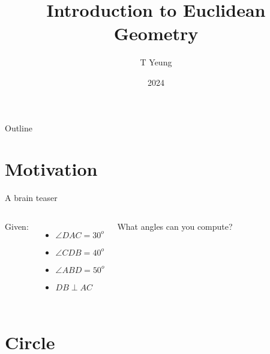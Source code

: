 \documentclass{beamer}
\title{Introduction to Euclidean Geometry}
\author{T Yeung}
\institute{THMSS}
\date{2024}
\begin{document}
\setlength{\abovedisplayskip}{3pt}
\setlength{\belowdisplayskip}{3pt}

\frame{\titlepage}
\begin{frame}{Outline}
	\tableofcontents[pausesections]
\end{frame}

\section{Motivation}
\begin{frame}{A brain teaser}
	\begin{columns}

		Given:
		\begin{itemize}
			\item $\angle DAC=30^o$
			\item $\angle CDB=40^o$
			\item $\angle ABD=50^o$
			\item $DB \perp AC$
		\end{itemize}
		What angles can you compute?
	\end{columns}
\end{frame}
\section{Circle}
\end{document}
